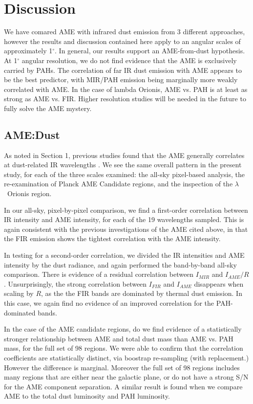 \documentclass[preprint2,longabstract]{aastex}
\begin{document}
\section{Discussion}
  \label{sec:discussion}

  We have comared AME with infrared dust emission from 3 different approaches, however the results and discussion contained here apply to an angular scales of approximately 1$^{\circ}$. In general, our results support an AME-from-dust hypothesis. At 1$^{\circ}$ angular resolution, we do not find evidence that the AME is exclusively carried by PAHs. The correlation of far IR dust emission with AME appears to be the best predictor, with MIR/PAH emission being marginally more weakly correlated with AME. In the case of lambda Orionis, AME vs. PAH is at least as strong as AME vs. FIR. Higher resolution studies will be needed in the future to fully solve the AME mystery.

      \subsection{AME:Dust}

        As noted in Section 1, previous studies found that the AME generally correlates at dust-related IR wavelengths \citep{ysard10b,planckXV, hensley16}. We see the same overall pattern in the present study, for each of the three scales examined: the all-sky pixel-based analysis, the re-examination of Planck AME Candidate regions, and the inspection of the $\lambda$~Orionis region.

         In our all-sky, pixel-by-pixel comparison, we find a first-order correlation between IR intensity and AME intensity, for each of the 19 wavelengths sampled. This is again consistent with the previous investigations of the AME cited above, in that the FIR emission shows the tightest correlation with the AME intensity.

         In testing for a second-order correlation, we divided the IR intensities and AME intensity by the dust radiance, and again performed the band-by-band all-sky comparison. There is evidence of a residual correlation between $I_{MIR}$ and $I_{AME}/R$. Unsurprisingly, the strong correlation between $I_{FIR}$ and $I_{AME}$ disappears when scaling by $R$, as the the FIR bands are dominated by thermal dust emission. In this case, we again find no evidence of an improved correlation for the PAH-dominated bands.

        In the case of the AME candidate regions, do we find evidence of a statistically stronger relationship between AME and total dust mass than AME vs. PAH mass, for the full set of 98 regions. We were able to confirm that the correlation coefficients are statistically distinct, via boostrap re-sampling (with replacement.) However the difference is marginal. Moreover the full set of 98 regions includes many regions that are either near the galactic plane, or do not have a strong S/N for the AME component separation. A similar result is found when we compare AME to the total dust luminosity and PAH luminosity.
\end{document}
